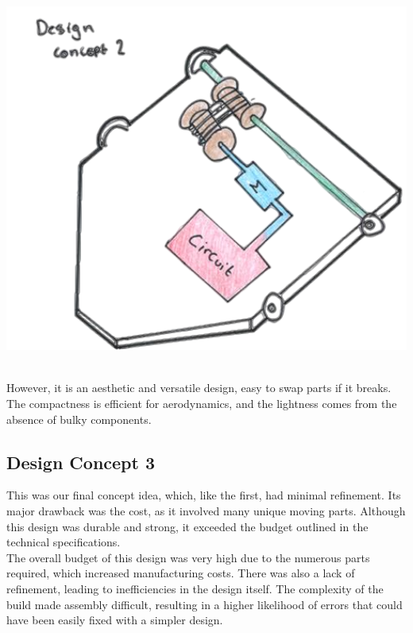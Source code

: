 \documentclass{article}
\begin{document}
\begin{minipage}{0.35\textwidth}
	\centering
	\includegraphics[width=1\textwidth]{images/image_7_2-Photoroom.png}
\end{minipage}\\[4pt]
However, it is an aesthetic and versatile design, easy to swap parts if it breaks. The compactness is efficient for aerodynamics, and the lightness comes from the absence of bulky components.\\[1em]
\begin{minipage}{0.59\textwidth}
	\subsection{Design Concept 3}
	This was our final concept idea, which, like the first, had minimal refinement. Its major drawback was the cost, as it involved many unique moving parts. Although this design was durable and strong, it exceeded the budget outlined in the technical specifications.\\[8pt]
	The overall budget of this design was very high due to the numerous parts required, which increased manufacturing costs. There was also a lack of refinement, leading to inefficiencies in the design itself. The complexity of the build made assembly difficult, resulting in a higher likelihood of errors that could have been easily fixed with a simpler design. 
\end{minipage}\hfill
\end{document}
